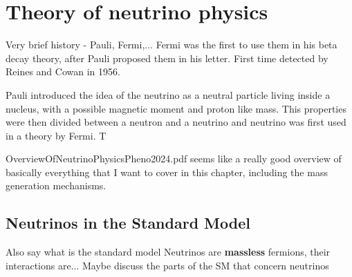 \chapter{Theory of neutrino physics}\label{sec:NeutrinoTheory}

Very brief history - Pauli, Fermi,...
Fermi was the first to use them in his beta decay theory, after Pauli proposed them in his letter. First time detected by Reines and Cowan in 1956.

Pauli introduced the idea of the neutrino as a neutral particle living inside a nucleus, with a possible magnetic moment and proton like mass. This properties were then divided between a neutron and a neutrino and neutrino was first used in a theory by Fermi. T

OverviewOfNeutrinoPhysicsPheno2024.pdf seems like a really good overview of basically everything that I want to cover in this chapter, including the mass generation mechanisms.



\section{Neutrinos in the Standard Model}
Also say what is the standard model
Neutrinos are \textbf{massless} fermions, their interactions are...
Maybe discuss the parts of the SM that concern neutrinos

